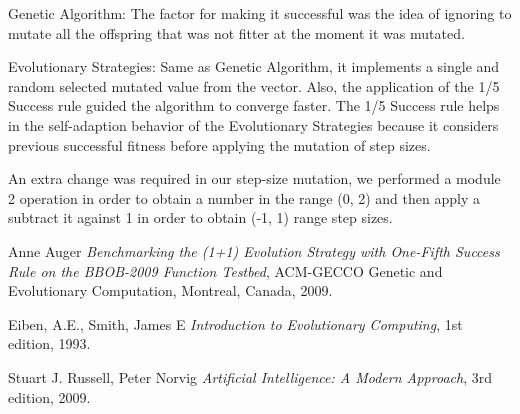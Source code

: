 \documentclass[]{spie}  %
\begin{document}
Genetic Algorithm: The factor for making it successful was the idea of ignoring to mutate all the offspring that was not fitter at the moment it was mutated.

Evolutionary Strategies: Same as Genetic Algorithm, it implements a single and random selected mutated value from the vector. Also, the application of the 1/5 Success rule \cite{auger09} guided the algorithm to converge faster. The 1/5 Success rule helps in the self-adaption behavior of the Evolutionary Strategies because it considers previous successful fitness before applying the mutation of step sizes.

An extra change was required in our step-size mutation, we performed a module 2 operation in order to obtain a number in the range (0, 2) and then apply a subtract it against 1 in order to obtain (-1, 1) range step sizes. 

\begin{thebibliography}{9}

Anne Auger
\emph{\:Benchmarking the (1+1) Evolution Strategy with One-Fifth Success Rule on the BBOB-2009 Function Testbed},
  ACM-GECCO Genetic and Evolutionary Computation,
  Montreal, Canada,
  2009.
  
 Eiben, A.E., Smith, James E 
  \emph{\:Introduction to Evolutionary Computing},
  1st edition,
  1993.

Stuart J. Russell, Peter Norvig
\emph{\:Artificial Intelligence: A Modern Approach},
  3rd edition,
  2009.
  
\end{thebibliography}
\end{document}
